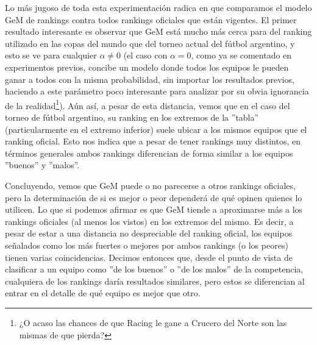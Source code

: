 \par Lo m\'as jugoso de toda esta experimentaci\'on radica en que comparamos el
modelo GeM de rankings contra todos rankings oficiales que est\'an vigentes. El
primer resultado interesante es observar que GeM est\'a mucho m\'as cerca para
del ranking utilizado en las copas del mundo que del torneo actual del f\'utbol
argentino, y esto se ve para cualquier $\alpha\neq 0$ (el caso con $\alpha = 0$,
como ya se comentado en experimentos previos, concibe un modelo donde todos los
equipos le pueden ganar a todos con la misma probabilidad, sin importar los
resultados previos, haciendo a este par\'ametro poco interesante para analizar
por su obvia ignorancia de la realidad\footnote{¿O acaso las chances de que
Racing le gane a Crucero del Norte son las mismas de que pierda?}). A\'un as\'i,
a pesar de esta distancia, vemos que en el caso del torneo de f\'utbol
argentino, su ranking en los extremos de la ''tabla'' (particularmente en el
extremo inferior) suele ubicar a los mismos equipos que el ranking oficial. Esto
nos indica que a pesar de tener rankings muy distintos, en t\'erminos generales
ambos rankings diferencian de forma similar a los equipos ''buenos'' y
''malos''.

\par Concluyendo, vemos que GeM puede o no parecerse a otros rankings oficiales,
pero la determinaci\'on de si es mejor o peor depender\'a de qué opinen quienes
lo utilicen. Lo que si podemos afirmar es que GeM tiende a aproximarse m\'as
a los rankings oficiales (al menos los vistos) en los extremos del mismo. Es
decir, a pesar de estar a una distancia no despreciable del ranking oficial, los
equipos se\~nalados como los m\'as fuertes o mejores por ambos rankings (o los
peores) tienen varias coincidencias. Decimos entonces que, desde el punto de
vista de clasificar a un equipo como ''de los buenos'' o ''de los malos'' de la
competencia, cualquiera de los rankings dar\'ia resultados similares, pero estos
se diferencian al entrar en el detalle de qué equipo es mejor que otro.
